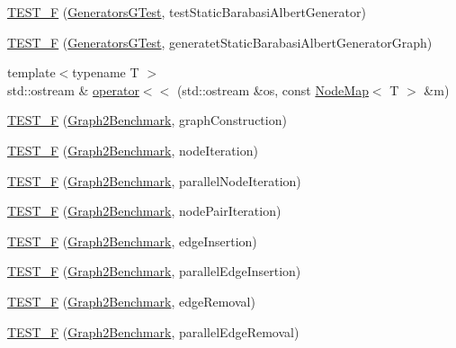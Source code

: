 \begin{DoxyCompactItemize}
\item 
\hyperlink{namespace_networ_kit_ae6b5b670a052b294826d67c169af4d6e}{T\-E\-S\-T\-\_\-\-F} (\hyperlink{class_networ_kit_1_1_generators_g_test}{Generators\-G\-Test}, test\-Static\-Barabasi\-Albert\-Generator)
\item 
\hyperlink{namespace_networ_kit_a5191e1ce71a193c87664970cd20bcfd0}{T\-E\-S\-T\-\_\-\-F} (\hyperlink{class_networ_kit_1_1_generators_g_test}{Generators\-G\-Test}, generatet\-Static\-Barabasi\-Albert\-Generator\-Graph)
\item 
{\footnotesize template$<$typename T $>$ }\\std\-::ostream \& \hyperlink{namespace_networ_kit_a8c89ddcd9b3d7bdce027da061f7ad522}{operator$<$$<$} (std\-::ostream \&os, const \hyperlink{class_networ_kit_1_1_node_map}{Node\-Map}$<$ T $>$ \&m)
\item 
\hyperlink{namespace_networ_kit_a1380d5e4eef1fb7e4e4eb7456506b457}{T\-E\-S\-T\-\_\-\-F} (\hyperlink{class_networ_kit_1_1_graph2_benchmark}{Graph2\-Benchmark}, graph\-Construction)
\item 
\hyperlink{namespace_networ_kit_a0f6fd2148f725f49525424061e0d57d8}{T\-E\-S\-T\-\_\-\-F} (\hyperlink{class_networ_kit_1_1_graph2_benchmark}{Graph2\-Benchmark}, node\-Iteration)
\item 
\hyperlink{namespace_networ_kit_a021d1e9c1f29871187483f76919e1898}{T\-E\-S\-T\-\_\-\-F} (\hyperlink{class_networ_kit_1_1_graph2_benchmark}{Graph2\-Benchmark}, parallel\-Node\-Iteration)
\item 
\hyperlink{namespace_networ_kit_addea5bddd0f76b73a69418ab374aeb40}{T\-E\-S\-T\-\_\-\-F} (\hyperlink{class_networ_kit_1_1_graph2_benchmark}{Graph2\-Benchmark}, node\-Pair\-Iteration)
\item 
\hyperlink{namespace_networ_kit_a4b123ae13e55b0533142a9d1c6b60caa}{T\-E\-S\-T\-\_\-\-F} (\hyperlink{class_networ_kit_1_1_graph2_benchmark}{Graph2\-Benchmark}, edge\-Insertion)
\item 
\hyperlink{namespace_networ_kit_adf410e709ed17519970ebf03e53f2287}{T\-E\-S\-T\-\_\-\-F} (\hyperlink{class_networ_kit_1_1_graph2_benchmark}{Graph2\-Benchmark}, parallel\-Edge\-Insertion)
\item 
\hyperlink{namespace_networ_kit_acd247c8b4b026c4a297fd53a73391348}{T\-E\-S\-T\-\_\-\-F} (\hyperlink{class_networ_kit_1_1_graph2_benchmark}{Graph2\-Benchmark}, edge\-Removal)
\item 
\hyperlink{namespace_networ_kit_a18662ed16cf9b2e99641cd08ff2b417b}{T\-E\-S\-T\-\_\-\-F} (\hyperlink{class_networ_kit_1_1_graph2_benchmark}{Graph2\-Benchmark}, parallel\-Edge\-Removal)

\end{DoxyCompactItemize}
